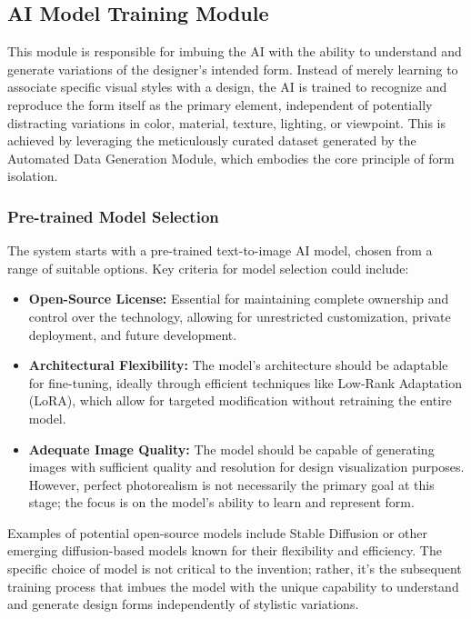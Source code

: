 \documentclass[12pt]{report}
\begin{document}
\subsection{AI Model Training Module}

This module is responsible for imbuing the AI with the ability to understand and generate variations of the designer's intended form. Instead of merely learning to associate specific visual styles with a design, the AI is trained to recognize and reproduce the form itself as the primary element, independent of potentially distracting variations in color, material, texture, lighting, or viewpoint. This is achieved by leveraging the meticulously curated dataset generated by the Automated Data Generation Module, which embodies the core principle of form isolation.

\subsubsection{Pre-trained Model Selection}
The system starts with a pre-trained text-to-image AI model, chosen from a range of suitable options. Key criteria for model selection could include:

\begin{itemize}
    \item \textbf{Open-Source License:} Essential for maintaining complete ownership and control over the technology, allowing for unrestricted customization, private deployment, and future development.
    \item \textbf{Architectural Flexibility:} The model's architecture should be adaptable for fine-tuning, ideally through efficient techniques like Low-Rank Adaptation (LoRA), which allow for targeted modification without retraining the entire model.
    \item \textbf{Adequate Image Quality:} The model should be capable of generating images with sufficient quality and resolution for design visualization purposes. However, perfect photorealism is not necessarily the primary goal at this stage; the focus is on the model's ability to learn and represent form.
\end{itemize}

Examples of potential open-source models include Stable Diffusion or other emerging diffusion-based models known for their flexibility and efficiency. The specific choice of model is not critical to the invention; rather, it's the subsequent training process that imbues the model with the unique capability to understand and generate design forms independently of stylistic variations.
\end{document}
